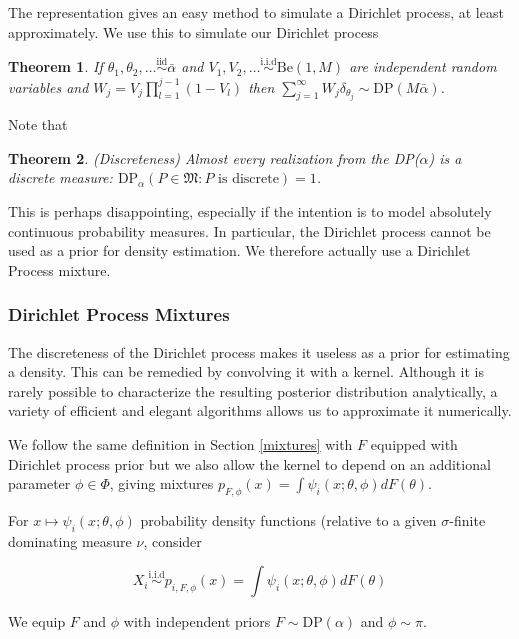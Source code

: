 \documentclass[a4paper,11pt]{article}
\theoremstyle{theorem}
\newtheorem{thm}{Theorem}
\theoremstyle{definition}
\begin{document}
The representation gives an easy method to simulate a Dirichlet process, at least approximately. We use this to simulate our Dirichlet process

\begin{thm}
If $\theta_1, \theta_2, \dotsc \overset{\text{iid}}{\sim}\bar{\alpha}$ and $V_1, V_2, \dotsc \overset{\text{i.i.d}}{\sim} \text{Be}(1, M)$ are independent random variables and $W_j = V_j\prod_{l=1}^{j-1}{(1-V_l)}$ then $\sum_{j=1}^{\infty}{W_j\delta_{\theta_j}} \sim \text{DP}(M\bar{\alpha})$.
\end{thm}

Note that
\begin{thm}
(Discreteness) Almost every realization from the DP($\alpha$) is a discrete measure: $\text{DP}_{\alpha}(P \in \mathfrak{M}: P \text{ is discrete}) = 1$.
\end{thm}

This is perhaps disappointing, especially if the intention is to model absolutely continuous probability measures. In particular, the Dirichlet process cannot be used as a prior for density estimation. We therefore actually use a Dirichlet Process mixture.

\subsubsection{Dirichlet Process Mixtures}

The discreteness of the Dirichlet process makes it useless as a prior for estimating a density. This can be remedied by convolving it with a kernel. Although it is rarely possible to characterize the resulting posterior distribution analytically, a variety of efficient and elegant algorithms allows us to approximate it numerically.

We follow the same definition in Section \ref{mixtures} with $F$ equipped with Dirichlet process prior but we also allow the kernel to depend on an additional parameter $\phi \in \Phi$, giving mixtures $p_{F, \phi}(x) = \int{\psi_{i}(x;\theta, \phi)dF(\theta)}$.

For $x \mapsto \psi_i(x;\theta,\phi)$ probability density functions (relative to a given $\sigma$-finite dominating measure $\nu$, consider

\[
X_i \overset{\text{i.i.d}}{\sim} p_{i, F, \phi}(x) = \int{\psi_i(x; \theta, \phi)dF(\theta)} 
\]

We equip $F$ and $\phi$ with independent priors $F \sim \text{DP}(\alpha)$ and $\phi \sim \pi$.
\end{document}
